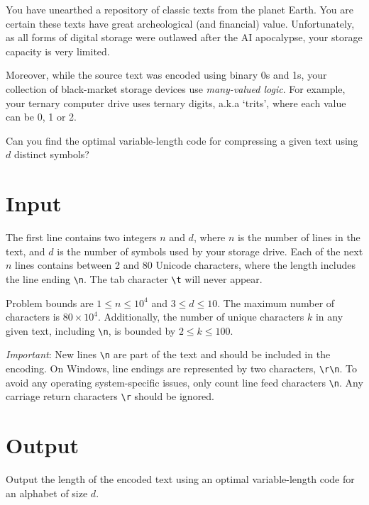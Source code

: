 
You have unearthed a repository of classic texts from the planet Earth. You are certain these texts have great archeological (and financial) value. Unfortunately, as all forms of digital storage were outlawed after the AI apocalypse, your storage capacity is very limited.

Moreover, while the source text was encoded using binary 0s and 1s, your collection of black-market storage devices use \textit{many-valued logic}. For example, your ternary computer drive uses ternary digits, a.k.a `trits', where each value can be 0, 1 or 2.

Can you find the optimal variable-length code for compressing a given text using $d$ distinct symbols?

\section*{Input}
The first line contains two integers $n$ and $d$, where $n$ is the number of lines in the text, and $d$ is the number of symbols used by your storage drive. Each of the next $n$ lines contains between 2 and 80 Unicode characters, where the length includes the line ending \verb|\n|. The tab character \verb|\t| will never appear.

Problem bounds are $1 \leq n \leq 10^4$ and $3 \leq d \leq 10$. The maximum number of characters is $80 \times 10^4$. Additionally, the number of unique characters $k$ in any given text, including \verb|\n|, is bounded by $2 \leq k \leq 100$.

\textit{Important}: New lines \verb|\n| are part of the text and should be included in the encoding. On Windows, line endings are represented by two characters, \verb|\r\n|. To avoid any operating system-specific issues, only count line feed characters \verb|\n|. Any carriage return characters \verb|\r| should be ignored.

\section*{Output}
Output the length of the encoded text using an optimal variable-length code for an alphabet of size $d$.
